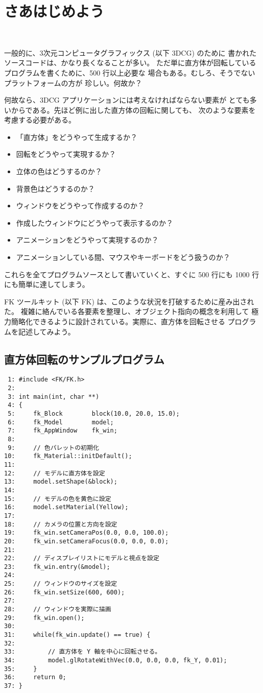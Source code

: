 \chapter{さあはじめよう} \label{chap:intro} ~

一般的に、3次元コンピュータグラフィックス (以下 3DCG) のために
書かれたソースコードは、かなり長くなることが多い。
ただ単に直方体が回転しているプログラムを書くために、500 行以上必要な
場合もある。むしろ、そうでないプラットフォームの方が
珍しい。何故か？

何故なら、3DCG アプリケーションには考えなければならない要素が
とても多いからである。先ほど例に出した直方体の回転に関しても、
次のような要素を考慮する必要がある。
\begin{itemize}
 \item 「直方体」をどうやって生成するか？
 \item 回転をどうやって実現するか？
 \item 立体の色はどうするのか？
 \item 背景色はどうするのか？
 \item ウィンドウをどうやって作成するのか？
 \item 作成したウィンドウにどうやって表示するのか？
 \item アニメーションをどうやって実現するのか？
 \item アニメーションしている間、マウスやキーボードをどう扱うのか？
\end{itemize}
これらを全てプログラムソースとして書いていくと、すぐに 500 行にも
1000 行にも簡単に達してしまう。

FK ツールキット (以下 FK) は、このような状況を打破するために産み出された。
複雑に絡んでいる各要素を整理し、オブジェクト指向の概念を利用して
極力簡略化できるように設計されている。実際に、直方体を回転させる
プログラムを記述してみよう。
\section{直方体回転のサンプルプログラム}
\begin{breakbox}
\begin{small}
\begin{verbatim}
 1: #include <FK/FK.h>
 2: 
 3: int main(int, char **)
 4: {
 5:     fk_Block        block(10.0, 20.0, 15.0);
 6:     fk_Model        model;
 7:     fk_AppWindow    fk_win;
 8: 
 9:     // 色パレットの初期化
10:     fk_Material::initDefault();          
11: 
12:     // モデルに直方体を設定
13:     model.setShape(&block);
14: 
15:     // モデルの色を黄色に設定
16:     model.setMaterial(Yellow);
17: 
18:     // カメラの位置と方向を設定
19:     fk_win.setCameraPos(0.0, 0.0, 100.0);
20:     fk_win.setCameraFocus(0.0, 0.0, 0.0);
21: 
22:     // ディスプレイリストにモデルと視点を設定
23:     fk_win.entry(&model);
24: 
25:     // ウィンドウのサイズを設定
26:     fk_win.setSize(600, 600);
27: 
28:     // ウィンドウを実際に描画
29:     fk_win.open();
30: 
31:     while(fk_win.update() == true) {
32: 
33:         // 直方体を Y 軸を中心に回転させる。
34:         model.glRotateWithVec(0.0, 0.0, 0.0, fk_Y, 0.01);
35:     }
36:     return 0;
37: }
\end{verbatim}
\end{small}
\end{breakbox}

